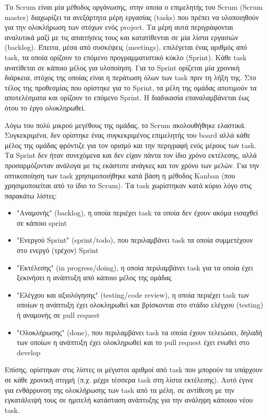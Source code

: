 Το Scrum είναι μία μέθοδος οργάνωσης, στην οποία ο επιμελητής του Scrum (Scrum master) διαχωρίζει τα ανεξάρτητα μέρη εργασίας (tasks) που πρέπει να υλοποιηθούν για την ολοκλήρωση των στόχων ενός project. Τα μέρη αυτά περιγράφονται αναλυτικά μαζί με τις απαιτήσεις τους και κατατίθενται σε μία λίστα εργασιών (backlog). Έπειτα, μέσα από συσκέψεις (meetings), επιλέγεται ένας αριθμός από task, τα οποία ορίζουν το επόμενο προγραμματιστικό κύκλο (Sprint). Κάθε task ανατίθεται σε κάποιο μέλος για υλοποίηση. Για το Sprint ορίζεται μία χρονική διάρκεια, στόχος της οποίας είναι η περάτωση όλων των task πριν τη λήξη της. Στο τέλος της προθεσμίας που ορίστηκε για το Sprint, τα μέλη της ομάδας αποτιμούν τα αποτελέσματα και ορίζουν το επόμενο Sprint. Η διαδικασία επαναλαμβάνεται έως ότου το έργο ολοκληρωθεί.

Λόγω του πολύ μικρού μεγέθους της ομάδας, το Scrum ακολουθήθηκε ελαστικά. Συγκεκριμένα, δεν ορίστηκε ένας συγκεκριμένος επιμελητής του board αλλά κάθε μέλος της ομάδας φρόντιζε για τον ορισμό και την περιγραφή ενός μέρους των task. Τα Sprint δεν ήταν συνεχόμενα και δεν είχαν πάντα τον ίδιο χρόνο εκτέλεσης, αλλά προσαρμόζονταν ανάλογα με τις εκάστοτε ανάγκες και τον χρόνο των μελών. Για την οπτικοποίηση των task χρησιμοποιήθηκε κατά βάση η μέθοδος Kanban (που χρησιμοποιείται από το ίδιο το Scrum). Τα task χωρίστηκαν κατά κύριο λόγο στις παρακάτω λίστες:

\begin{itemize}
    \item "Αναμονής" (backlog), η οποία περιέχει task τα οποία δεν έχουν ακόμα εισαχθεί σε κάποιο sprint
    \item "Ενεργού Sprint" (sprint/todo), που περιλαμβάνει task τα οποία συμμετέχουν στο ενεργό (τρέχον) Sprint
    \item "Εκτέλεσης" (in progress/doing), η οποία περιλαμβάνει task για τα οποία έχει ξεκινήσει η ανάπτυξη από κάποιο μέλος της ομάδας
    \item "Ελέγχου και αξιολόγησης" (testing/code review), η οποία περιέχει task των οποίων η ανάπτυξη έχει ολοκληρωθεί και βρίσκονται στο στάδιο ελέγχου (testing) ή αναμονής σε pull request
    \item "Ολοκλήρωσης" (done), που περιλαμβάνει task τα οποία έχουν τελειώσει, δηλαδή των οποίων η ανάπτυξη έχει ολοκληρωθεί και το pull request έχει ενωθεί στο develop
\end{itemize}

Επίσης, ορίστηκαν στις λίστες οι μέγιστοι αριθμοί από task που μπορούν τα υπάρχουν σε κάθε χρονική στιγμή (π.χ. μέχρι τέσσερα task στη λίστα εκτέλεσης). Αυτό έγινε για ενθάρρυνση της ολοκλήρωσης των task από τα μέλη, σε αντίθεση με την εγκατάλειψή τους σε ημιτελή κατάσταση ανάπτυξης για την ανάληψη κάποιου νέου task.


